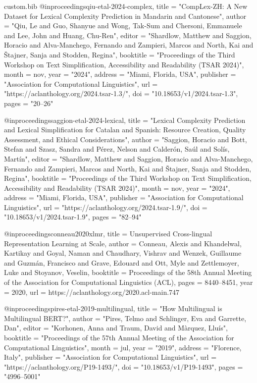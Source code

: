 \begin{filecontents*}[overwrite]{custom.bib}
@inproceedings{qiu-etal-2024-complex,
    title = "{C}omp{L}ex-{ZH}: A New Dataset for Lexical Complexity Prediction in {M}andarin and {C}antonese",
    author = "Qiu, Le  and
      Guo, Shanyue  and
      Wong, Tak-Sum  and
      Chersoni, Emmanuele  and
      Lee, John  and
      Huang, Chu-Ren",
    editor = "Shardlow, Matthew  and
      Saggion, Horacio  and
      Alva-Manchego, Fernando  and
      Zampieri, Marcos  and
      North, Kai  and
      {\v{S}}tajner, Sanja  and
      Stodden, Regina",
    booktitle = "Proceedings of the Third Workshop on Text Simplification, Accessibility and Readability (TSAR 2024)",
    month = nov,
    year = "2024",
    address = "Miami, Florida, USA",
    publisher = "Association for Computational Linguistics",
    url = "https://aclanthology.org/2024.tsar-1.3/",
    doi = "10.18653/v1/2024.tsar-1.3",
    pages = "20--26"
}

@inproceedings{saggion-etal-2024-lexical,
    title = "Lexical Complexity Prediction and Lexical Simplification for {C}atalan and {S}panish: Resource Creation, Quality Assessment, and Ethical Considerations",
    author = "Saggion, Horacio  and
      Bott, Stefan  and
      Szasz, Sandra  and
      P{\'e}rez, Nelson  and
      Calder{\'o}n, Sa{\'u}l  and
      Sol{\'i}s, Mart{\'i}n",
    editor = "Shardlow, Matthew  and
      Saggion, Horacio  and
      Alva-Manchego, Fernando  and
      Zampieri, Marcos  and
      North, Kai  and
      {\v{S}}tajner, Sanja  and
      Stodden, Regina",
    booktitle = "Proceedings of the Third Workshop on Text Simplification, Accessibility and Readability (TSAR 2024)",
    month = nov,
    year = "2024",
    address = "Miami, Florida, USA",
    publisher = "Association for Computational Linguistics",
    url = "https://aclanthology.org/2024.tsar-1.9/",
    doi = "10.18653/v1/2024.tsar-1.9",
    pages = "82--94"
}

@inproceedings{conneau2020xlmr,
  title        = {Unsupervised Cross-lingual Representation Learning at Scale},
  author       = {Conneau, Alexis and Khandelwal, Kartikay and Goyal, Naman and Chaudhary, Vishrav and Wenzek, Guillaume and Guzm{\'a}n, Francisco and Grave, Edouard and Ott, Myle and Zettlemoyer, Luke and Stoyanov, Veselin},
  booktitle    = {Proceedings of the 58th Annual Meeting of the Association for Computational Linguistics (ACL)},
  pages        = {8440--8451},
  year         = {2020},
  url          = {https://aclanthology.org/2020.acl-main.747}
}

@inproceedings{pires-etal-2019-multilingual,
    title = "How Multilingual is Multilingual {BERT}?",
    author = "Pires, Telmo  and
      Schlinger, Eva  and
      Garrette, Dan",
    editor = "Korhonen, Anna  and
      Traum, David  and
      M{\`a}rquez, Llu{\'i}s",
    booktitle = "Proceedings of the 57th Annual Meeting of the Association for Computational Linguistics",
    month = jul,
    year = "2019",
    address = "Florence, Italy",
    publisher = "Association for Computational Linguistics",
    url = "https://aclanthology.org/P19-1493/",
    doi = "10.18653/v1/P19-1493",
    pages = "4996--5001"
}


\end{filecontents*}
